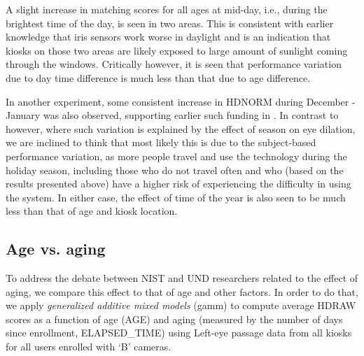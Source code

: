 \documentclass{cta-author}%
\begin{document}

A  slight  increase in matching scores for all ages at mid-day, i.e., during the brightest time of the day, is seen in two areas. 
This is consistent with earlier knowledge that iris sensors work worse in daylight 
and is an indication that kiosks on those two areas are likely exposed to large amount of sunlight coming through the windows.
Critically however, it is seen that  performance variation due to day time difference is much less than that due to age difference.

In another experiment, some consistent increase in HDNORM during December - January was also observed,  supporting  earlier such funding in \cite{Bowyer-BTAS2016}. 
In contrast to \cite{Bowyer-BTAS2016} however, where such variation is explained by the effect of season on eye dilation, 
we are inclined to think that   most likely this is due to the subject-based performance variation, 
as more people travel and use the technology during the holiday season, including those who do not travel often and who (based on the results presented above) have a higher risk of experiencing the difficulty in using the system.  
In either case, the effect of  time of the year is also seen to be much less than that of age  and kiosk location.

\subsection{Age vs. aging}

To address the debate between NIST and UND researchers related to the effect of aging, 
we compare this effect to that of age and other factors.
In order to do that, we apply 
{\it generalized additive mixed models} (gamm) \cite{R-gam}
to compute average HDRAW scores as a function of age (AGE) and aging (measured by the number of days since enrollment, ELAPSED\_TIME)
using  Left-eye passage data from all kiosks for all users enrolled with `B' cameras.
\end{document}
